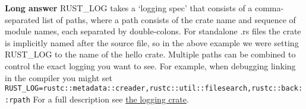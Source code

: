 \documentclass[]{article}
\begin{document}
\textbf{Long answer} RUST\_LOG takes a `logging spec' that consists of a
comma-separated list of paths, where a path consists of the crate name
and sequence of module names, each separated by double-colons. For
standalone .rs files the crate is implicitly named after the source
file, so in the above example we were setting RUST\_LOG to the name of
the hello crate. Multiple paths can be combined to control the exact
logging you want to see. For example, when debugging linking in the
compiler you might set
\texttt{RUST\_LOG=rustc::metadata::creader,rustc::util::filesearch,rustc::back::rpath}
For a full description see \href{log/index.html}{the logging crate}.
\end{document}
